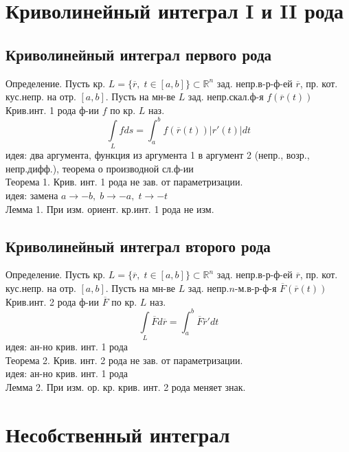 \documentclass{article}
\begin{document}
\section{Криволинейный интеграл I и II рода}
\subsection{Криволинейный интеграл первого рода}
Определение. Пусть кр. $L = \{ \overline{r}, \; t \in [a,b] \} \subset \mathbb R^n$ зад. непр.в-р-ф-ей $\overline{r}$, пр. кот. кус.непр. на отр. $[a,b]$. Пусть на мн-ве $L$ зад. непр.скал.ф-я $f(\overline{r}(t))$ \\
Крив.инт. 1 рода ф-ии $f$ по кр. $L$ наз. \\
\begin{equation*}
    \underset{L}{\int} fds = \int_a^b f(\overline{r}(t))|r'(t)|dt
\end{equation*}
идея: два аргумента, функция из аргумента 1 в аргумент 2 (непр., возр., непр.дифф.), теорема о производной сл.ф-ии \\
Теорема 1. Крив. инт. 1 рода не зав. от параметризации. \\
идея: замена $a \rightarrow -b, \; b \rightarrow -a, \; t \rightarrow -t$ \\
Лемма 1. При изм. ориент. кр.инт. 1 рода не изм.
\subsection{Криволинейный интеграл второго рода}
Определение. Пусть кр. $L = \{ \overline{r}, \; t \in [a,b] \} \subset \mathbb R^n$ зад. непр.в-р-ф-ей $\overline{r}$, пр. кот. кус.непр. на отр. $[a,b]$. Пусть на мн-ве $L$ зад. непр.$n$-м.в-р-ф-я $\overline{F}(\overline{r}(t))$ \\
Крив.инт. 2 рода ф-ии $\overline F$ по кр. $L$ наз. \\
\begin{equation*}
    \underset{L}{\int} \overline F d \overline r = \int_a^b \overline F \overline r' dt
\end{equation*}
идея: ан-но крив. инт. 1 рода \\
Теорема 2. Крив. инт. 2 рода не зав. от параметризации. \\
идея: ан-но крив. инт. 1 рода \\
Лемма 2. При изм. ор. кр. крив. инт. 2 рода меняет знак.


\section{Несобственный интеграл}
\end{document}
